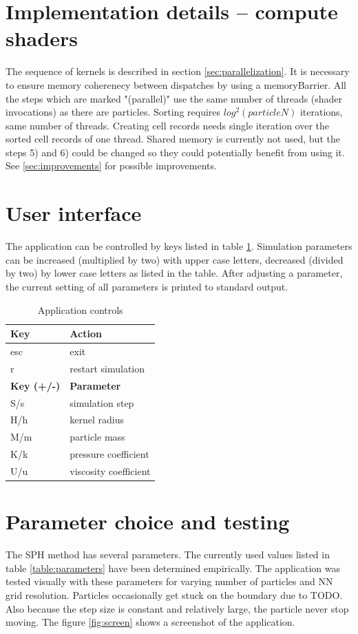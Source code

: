 \documentclass[a4paper,report]{IEEEtran}
\begin{document}
\section{Implementation details -- compute shaders}
The sequence of kernels is described in section \ref{sec:parallelization}. It is necessary to ensure memory coherenecy between dispatches by using a memoryBarrier. All the steps which are marked "(parallel)" use the same number of threads (shader invocations) as there are particles. Sorting requires $log^2(particleN)$ iterations, same number of threads. Creating cell records needs single iteration over the sorted cell records of one thread. Shared memory is currently not used, but the steps 5) and 6) could be changed so they could potentially benefit from using it. See \ref{sec:improvements} for possible improvements.

\section{User interface}
The application can be controlled by keys listed in table \ref{table:controls}. Simulation parameters can be increased (multiplied by two) with upper case letters, decreased (divided by two) by lower case letters as listed in the table. After adjusting a parameter, the current setting of all parameters is printed to standard output.
\begin{table}[h]
	\normalsize
	\centering
	\begin{tabular}{|l|l|}
		\hline
		\textbf{Key} & \textbf{Action} \\
		\hline
		\hline
		esc & exit \\
		r & restart simulation \\
		\hline
		\hline
		\textbf{Key (+/-)} & \textbf{Parameter} \\
		\hline
		\hline
		S/s & simulation step \\
		H/h & kernel radius \\
		M/m & particle mass \\
		K/k & pressure coefficient \\
		U/u & viscosity coefficient \\
		\hline
	\end{tabular}
	\caption{Application controls}
	\label{table:controls}
\end{table}

\section{Parameter choice and testing}
The SPH method has several parameters. The currently used values listed in table \ref{table:parameters} have been determined empirically. The application was tested visually with these parameters for varying number of particles and NN grid resolution. Particles occasionally get stuck on the boundary due to TODO. Also because the step size is constant and relatively large, the particle never stop moving. The figure \ref{fig:screen} shows a screenshot of the application.
\end{document}
